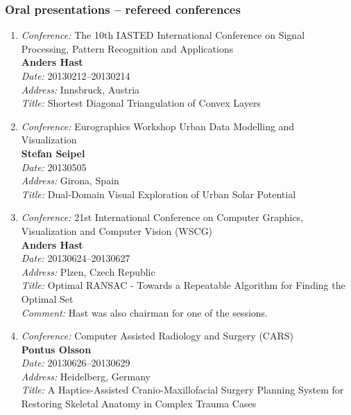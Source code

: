 \subsubsection{Oral presentations -- refereed conferences}
\begin{enumerate}
\item 
{\em Conference:} The 10th IASTED International Conference on Signal Processing, Pattern Recognition and Applications~\\
{\bf Anders Hast}~\\
{\em Date:} 20130212--20130214~\\
{\em Address:} Innsbruck, Austria~\\
{\em Title:} Shortest Diagonal Triangulation of Convex Layers

\item 
{\em Conference:} Eurographics Workshop Urban Data Modelling and Visualization~\\
{\bf Stefan Seipel}~\\
{\em Date:} 20130505~\\
{\em Address:} Girona, Spain~\\
{\em Title:} Dual-Domain Visual Exploration of Urban Solar Potential

\item 
{\em Conference:} 21st International Conference on Computer Graphics, Visualization and Computer Vision (WSCG)~\\
{\bf Anders Hast}~\\
{\em Date:} 20130624--20130627~\\
{\em Address:} Plzen, Czech Republic~\\
{\em Title:} Optimal RANSAC - Towards a Repeatable Algorithm for Finding the Optimal Set~\\
{\em Comment:} Hast was also chairman for one of the sessions.


\item 
{\em Conference:} Computer Assisted Radiology and Surgery (CARS)~\\
{\bf Pontus Olsson}~\\
{\em Date:} 20130626--20130629~\\
{\em Address:} Heidelberg, Germany~\\
{\em Title:} A Haptics-Assisted Cranio-Maxillofacial Surgery Planning System for Restoring Skeletal Anatomy in Complex Trauma Cases


\end{enumerate}

